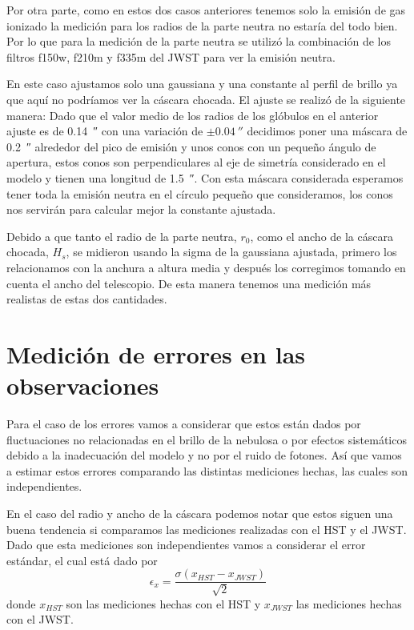 \documentclass{book}
\begin{document}
Por otra parte, como en estos dos casos anteriores tenemos solo la emisión de gas ionizado la medición para los radios de la parte neutra no estaría del todo bien. Por lo que para la medición de la parte neutra se utilizó la combinación de los filtros f150w, f210m y f335m del JWST para ver la emisión neutra. 

En este caso ajustamos solo una gaussiana y una constante al perfil de brillo ya que aquí no podríamos ver la cáscara chocada. El ajuste se realizó de la siguiente manera: Dado que el valor medio de los radios de los glóbulos en el anterior ajuste es de  \SI{0.14}{\arcsecond} con una variación de $\pm\SI{0.04}{\arcsecond}$ decidimos poner una máscara de \SI{0.2}{\arcsecond} alrededor del pico de emisión y unos conos con un pequeño ángulo de apertura, estos conos son perpendiculares al eje de simetría considerado en el modelo y tienen una longitud de \SI{1.5}{\arcsecond}. Con esta máscara considerada esperamos tener toda la emisión neutra en el círculo pequeño que consideramos, los conos nos servirán para calcular mejor la constante ajustada. 

Debido a que tanto el radio de la parte neutra, $r_0$, como el ancho de la cáscara chocada, $H_s$, se midieron usando la sigma de la gaussiana ajustada, primero los relacionamos con la anchura a altura media y después los corregimos tomando en cuenta el ancho del telescopio. De esta manera tenemos una medición más realistas de estas dos cantidades.

\section{Medición de errores en las observaciones}

Para el caso de los errores vamos a considerar que estos están dados por fluctuaciones no relacionadas en el brillo de la nebulosa o por efectos  sistemáticos debido a la inadecuación del modelo y no por el ruido de fotones. Así que vamos a estimar estos errores comparando las distintas mediciones hechas, las cuales son independientes.

En el caso del radio y ancho de la cáscara podemos notar que estos siguen una buena tendencia si comparamos las mediciones realizadas con el HST y el JWST. Dado que esta mediciones son independientes vamos a considerar el error estándar, el cual está dado por
\[\epsilon_x = \frac{\sigma(x_{HST}-x_{JWST})}{\sqrt{2}}\] donde $x_{HST}$ son las mediciones hechas con el HST y $x_{JWST}$ las mediciones hechas con el JWST.
\end{document}
